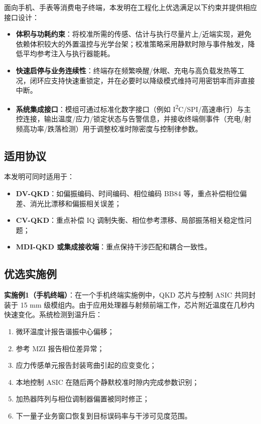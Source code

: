\documentclass[12pt,a4paper]{article}
\begin{document}
面向手机、手表等消费电子终端，本发明在工程化上优选满足以下约束并提供相应接口设计：
\begin{itemize}[noitemsep]
    \item \textbf{体积与功耗约束}：将校准所需的传感、估计与执行尽量片上/近端实现，避免依赖体积较大的外置温控与光学台架；校准策略采用静默时隙与事件触发，降低平均参考注入与执行器能耗。
    \item \textbf{快速启停与业务连续性}：终端存在频繁唤醒/休眠、充电与高负载发热等工况，闭环应支持快速重锁定，并在必要时以降级模式维持可用密钥率而非直接中断。
    \item \textbf{系统集成接口}：模组可通过标准化数字接口（例如 I\textsuperscript{2}C/SPI/高速串行）与主控连接，输出温度/应力/锁定状态与告警信息，并接收终端侧事件（充电/射频高功率/跌落检测）用于调整校准时隙密度与控制律参数。
\end{itemize}

\subsection{适用协议}

本发明可同时适用于：
\begin{itemize}[noitemsep]
    \item \textbf{DV-QKD}：如偏振编码、时间编码、相位编码 BB84 等，重点补偿相位偏差、消光比漂移和偏振相关误差；
    \item \textbf{CV-QKD}：重点补偿 IQ 调制失衡、相位参考漂移、局部振荡相关稳定性问题；
    \item \textbf{MDI-QKD 或集成接收端}：重点保持干涉匹配和耦合一致性。
\end{itemize}

\subsection{优选实施例}

\textbf{实施例1（手机终端）}：在一个手机终端实施例中，QKD 芯片与控制 ASIC 共同封装于 15 mm 级模组内。由于应用处理器与射频前端工作，芯片附近温度在几秒内快速变化。系统检测到温升后：
\begin{enumerate}[label=(\arabic*)]
    \item 微环温度计报告谐振中心偏移；
    \item 参考 MZI 报告相位差异常；
    \item 应力传感单元报告封装弯曲引起的应变变化；
    \item 本地控制 ASIC 在随后两个静默校准时隙内完成参数识别；
    \item 加热器阵列与相位调制器偏置被同时修正；
    \item 下一量子业务窗口恢复到目标误码率与干涉可见度范围。
\end{enumerate}
\end{document}
